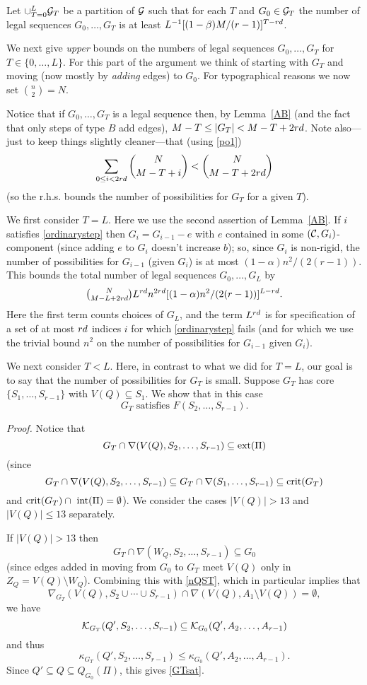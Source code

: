 \documentclass[letterpaper,11pt]{article}
\newcommand{\beq}[1]{\begin{equation}\label{#1}}
\newcommand{\enq}[0]{\end{equation}}
\newcommand{\mn}[0]{\medskip\noindent}
\newcommand{\sub}[0]{\subseteq}
\newcommand{\sm}[0]{\setminus}
\renewcommand{\dots}[0]{,\ldots,}
\newcommand{\cee}[0]{{\cal C}}
\newcommand{\g}[0]{{\cal G}}
\newcommand{\K}[0]{{\cal K}}
\newcommand{\inte}[0]{{\rm int}}
\newcommand{\crit}[0]{{\rm crit}}
\newcommand{\ext}[0]{{\rm ext}}
\newcommand{\0}[0]{\emptyset}
\newcommand{\C}[2]{{{#1}\choose{{#2}}}}
\newcommand{\Cc}[0]{\tbinom}
\newcommand{\ga}[0]{\alpha }
\newcommand{\gb}[0]{\beta }
\begin{document}
\bigskip
Let $\cup_{T=0}^L\g_T$
be a partition of $\g$ such that for each $T$ and $G_0\in \g_T$
the number of legal sequences $G_0\dots G_T$
is at least $L^{-1}[(1-\gb)M/(r-1)]^{T-r\qq}$.

\medskip
We next give {\em upper} bounds on the numbers of legal sequences
$G_0\dots G_T$ for $T\in \{0\dots L\}$.
For this part of the argument we think of starting with $G_T$
and moving (now mostly by {\em adding} edges) to $G_0$.
For typographical reasons we now set $\C{n}{2}=N$.

Notice that if $G_0\dots G_T$ is a legal sequence
then, by Lemma~\ref{AB} (and the fact that only steps of type $B$
add edges), $M-T\leq |G_T|< M-T+2rd$.
Note also---just to keep things slightly cleaner---that
(using \eqref{po1})
\beq{NGT}
\sum_{0\leq i< 2r\qq}\C{N}{M-T+i}< \C{N}{M-T+2r\qq}
\enq
(so the r.h.s. bounds the number of possibilities for $G_T$
for a given $T$).


\medskip
We first consider $T=L$.
Here we use the second assertion of Lemma~\ref{AB}.
If $i$ satisfies \eqref{ordinarystep}
then
$G_i=G_{i-1}-e$ with
$e$ contained in some $(\cee,G_i)$-component
(since adding $e$ to $G_i$ doesn't increase $b$);
so, since $G_i$ is non-rigid, the number of
possibilities for $G_{i-1}$ (given $G_i$) is at most
$(1-\ga )n^2/(2(r-1))$.
This bounds the total number of legal sequences
$G_0\dots G_L$ by
\beq{T=L}
\Cc{N}{M-L+2r\qq}L^{r\qq}n^{2r\qq }
[(1-\ga )n^2/(2(r-1))]^{L-r\qq }.
\enq
Here the first term counts choices of $G_L$, and
the term $L^{rd}$ is for specification of a set of at most
$rd$ indices
$i$ for which \eqref{ordinarystep} fails
(and for which we use the
trivial bound $n^2$ on the number of possibilities
for $G_{i-1}$ given
$G_i$).


\medskip
We next consider $T<L$.
Here, in contrast to what we did for $T=L$, our
goal is to say that the number of possibilities
for $G_T$ is small.
%
Suppose $G_T$ has core $\{S_1\dots S_{r-1}\}$
with $V(Q)\sub S_1$.  We show that in this case
\beq{GTsat}
\mbox{$G_T$ satisfies $F(S_2\dots S_{r-1})$.}
\enq

\mn
{\em Proof.} %
Notice that
\beq{nQST}
G_T\cap\nabla(V(Q),S_2\dots S_{r-1})\sub \ext(\Pi)
\enq
(since
\[G_T\cap\nabla(V(Q),S_2\dots S_{r-1})
\sub G_T\cap\nabla(S_1\dots S_{r-1})\sub \crit(G_T)\]
and $\crit(G_T)\cap ~\inte(\Pi)=\0$).
We consider the cases $|V(Q)|>13$ and $|V(Q)|\leq 13$
separately.

If $|V(Q)|>13$ then
\beq{GTcap}
G_T\cap \nabla(W_Q,S_2\dots S_{r-1})\sub G_0
\enq
(since edges added in moving from $G_0$ to $G_T$
meet $V(Q)$ only in $Z_Q=V(Q)\sm W_Q$).
Combining this with \eqref{nQST},
which in particular implies that
\[\nabla_{G_T}(V(Q),S_2\cup\cdots \cup S_{r-1})\cap
\nabla(V(Q),A_1\sm V(Q))=\0,\]
we have
\[
\K_{G_T}(Q',S_2\dots S_{r-1})
\sub \K_{G_0}(Q',A_2\dots A_{r-1})
\]
and thus
\[
\kappa_{G_T}(Q',S_2\dots S_{r-1})
\leq \kappa_{G_0}(Q',A_2\dots A_{r-1}).
\]
%
Since $Q'\sub Q\sub Q_{G_0}(\Pi)$, this gives \eqref{GTsat}.
\end{document}
